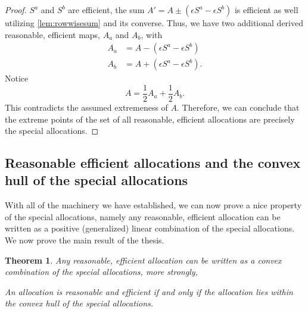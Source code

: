 \documentclass[12pt,letterpaper,final]{article}
\theoremstyle{plain}
\newtheorem{theorem}{Theorem}[section]
\theoremstyle{plain}
\theoremstyle{plain}
\theoremstyle{plain}
\theoremstyle{plain}
\theoremstyle{plain}
\theoremstyle{plain}
\theoremstyle{definition}
\theoremstyle{definition}
\theoremstyle{definition}
\theoremstyle{definition}
\theoremstyle{definition}
\theoremstyle{remark}
\theoremstyle{remark}
\theoremstyle{remark}
\theoremstyle{remark}
\begin{document}
\begin{proof}
  \(S^a\) and \(S^b\) are efficient, the sum
  \(A' = A\pm(\epsilon S^a - \epsilon S^b)\) is efficient as well
  utilizing \cref{lem:rowwisesum} and its converse.
  Thus, we have two additional derived reasonable, efficient 
  maps, \(A_a\) and \(A_b\), with
  \begin{align*}
    A_a & = A - (\epsilon S^a - \epsilon S^b)\\
    A_b & = A + (\epsilon S^a - \epsilon S^b).
  \end{align*}
  Notice
  \[
    A = \frac{1}{2} A_a + \frac{1}{2} A_b.
  \]
  This contradicts the assumed extremeness of \(A\). Therefore, we can
  conclude that the extreme points of the set of all reasonable,
  efficient allocations are
  precisely the special allocations. 
\end{proof}

\subsection{Reasonable efficient allocations and the convex hull of
  the special allocations}

With all of the machinery we have established, we can now prove a nice
property of the special allocations, namely any reasonable,
efficient allocation can be written as a
positive (generalized) linear combination of the special allocations. 
We now prove the main result of the thesis.

\begin{theorem}\label{thm:saavConvexHullRAAV}
  Any reasonable, efficient allocation can be written as a convex
  combination of the special allocations, more strongly, 
  \begin{center}
    An allocation is reasonable and efficient if and only if the
    allocation lies within the convex hull of the special allocations.
  \end{center}
\end{theorem}
\end{document}
